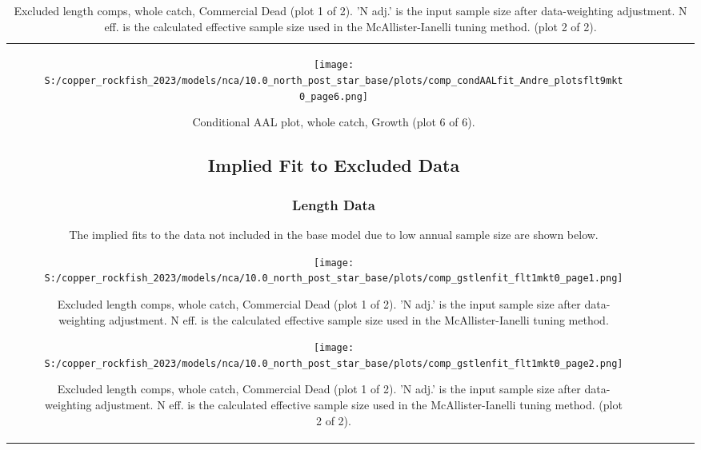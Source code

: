 \documentclass[11pt,
  letterpaper,
]{article}
\begin{document}
\begin{longtable}[t]{c>{\centering\arraybackslash}p{2cm}>{\centering\arraybackslash}p{2cm}>{\centering\arraybackslash}p{2cm}}
\begin{figure}
{\centering
\texttt{[image: S:/copper\_rockfish\_2023/models/nca/10.0\_north\_post\_star\_base/plots/comp\_condAALfit\_Andre\_plotsflt9mkt0\_page6.png]}
}
\caption{Conditional AAL plot, whole catch, Growth (plot 6 of 6).\label{fig:comp-condAALfit-Andre-plotsflt9mkt0-page6}}
\end{figure}

\subsection{Implied Fit to Excluded Data}\label{excluded-data}

\subsubsection{Length Data}\label{length-data-1}

The implied fits to the data not included in the base model due to low annual sample size are shown below.

\begin{figure}
{\centering
\texttt{[image: S:/copper\_rockfish\_2023/models/nca/10.0\_north\_post\_star\_base/plots/comp\_gstlenfit\_flt1mkt0\_page1.png]}
}
\caption{Excluded length comps, whole catch, Commercial Dead (plot 1 of 2).  'N adj.' is the input sample size after data-weighting adjustment. N eff. is the calculated effective sample size used in the McAllister-Ianelli tuning method.\label{fig:comp-gstlenfit-flt1mkt0-page1}}
\end{figure}

\begin{figure}
{\centering
\texttt{[image: S:/copper\_rockfish\_2023/models/nca/10.0\_north\_post\_star\_base/plots/comp\_gstlenfit\_flt1mkt0\_page2.png]}
}
\caption{Excluded length comps, whole catch, Commercial Dead (plot 1 of 2).  'N adj.' is the input sample size after data-weighting adjustment. N eff. is the calculated effective sample size used in the McAllister-Ianelli tuning method. (plot 2 of 2).\label{fig:comp-gstlenfit-flt1mkt0-page2}}
\end{figure}


\end{longtable}
\end{document}
